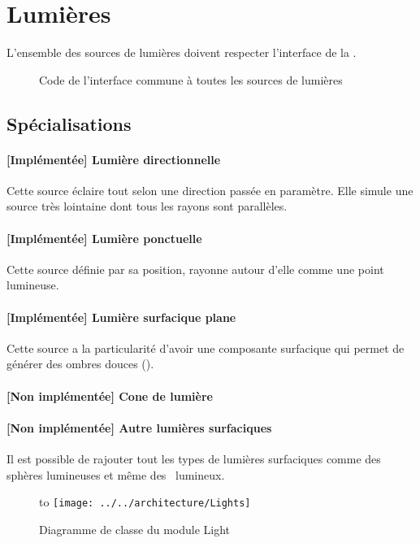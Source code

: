 \section{Lumières}
L'ensemble des sources de lumières doivent respecter l'interface de la
. 

\begin{figure}[h]
  \caption{Code de l'interface commune à toutes les
  sources de lumières\label{fig:ILights}}
\end{figure}

\subsection{Spécialisations}
\paragraph{[Implémentée] Lumière directionnelle} Cette source éclaire tout
selon une direction passée en paramètre. Elle simule une source très lointaine
dont tous les rayons sont parallèles.

\paragraph{[Implémentée] Lumière ponctuelle} Cette source définie par sa
position, rayonne autour d'elle comme une point lumineuse.

\paragraph{[Implémentée] Lumière surfacique plane} Cette source a la
particularité d'avoir une composante surfacique qui permet de générer des
ombres douces (\cf {}).

\paragraph{[Non implémentée] Cone de lumière}

\paragraph{[Non implémentée] Autre lumières surfaciques} Il est possible de
rajouter tout les types de lumières surfaciques comme des sphères lumineuses et
même des \ lumineux. 

\begin{figure}[h]
  \hbox to \textwidth
  {\hss\texttt{[image: ../../architecture/Lights]}\hss}
  \caption{Diagramme de classe du module Light\label{fig:CDLights}}
\end{figure}
